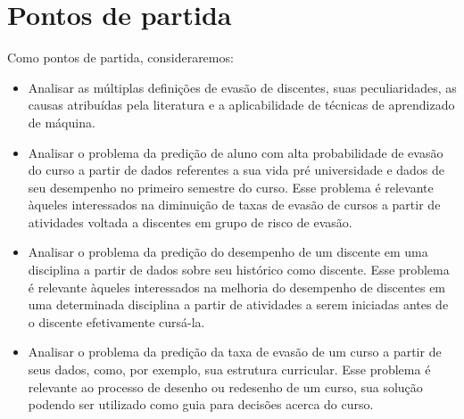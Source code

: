 \chapter{Pontos de partida}

Como pontos de partida, consideraremos:

\begin{itemize}

\item Analisar as múltiplas definições de evasão de discentes, suas peculiaridades, as causas atribuídas pela literatura e a aplicabilidade de técnicas de aprendizado de máquina.

\item Analisar o problema da predição de aluno com alta probabilidade de evasão do curso a partir de dados referentes a sua vida pré universidade e dados de seu desempenho no primeiro semestre do curso. Esse problema é relevante àqueles interessados na diminuição de taxas de evasão de cursos a partir de atividades voltada a discentes em grupo de risco de evasão.

\item Analisar o problema da predição do desempenho de um discente em uma disciplina a partir de dados sobre seu histórico como discente. Esse problema é relevante àqueles interessados na melhoria do desempenho de discentes em uma determinada disciplina a partir de atividades a serem iniciadas antes de o discente efetivamente cursá-la.

\item Analisar o problema da predição da taxa de evasão de um curso a partir de seus dados, como, por exemplo, sua estrutura curricular. Esse problema é relevante ao processo de desenho ou redesenho de um curso, sua solução podendo ser utilizado como guia para decisões acerca do curso.

\end{itemize}

